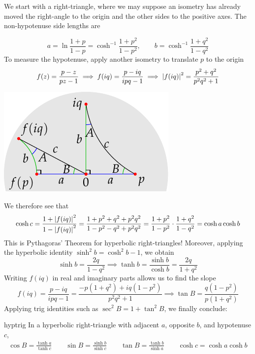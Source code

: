 We start with a right-triangle, where we may suppose an isometry has already moved the right-angle to the origin and the other sides to the positive axes. The non-hypotenuse side lengths are\par
\begin{minipage}[t]{0.675\linewidth}\vspace{-8pt}
\[a=\ln\frac{1+p}{1-p}=\cosh^{-1}\frac{1+p^2}{1-p^2},\qquad b=\cosh^{-1}\frac{1+q^2}{1-q^2}\]
To measure the hypotenuse, apply another isometry to translate $p$ to the origin
\[f(z)=\frac{p-z}{pz-1} \implies f(iq)=\frac{p-iq}{ipq-1} \implies \left| f(iq)\right|^2=\frac{p^2+q^2}{p^2q^2+1}\]
\end{minipage}\hfill\begin{minipage}[t]{0.3\linewidth}\vspace{0pt}
\flushright\includegraphics[scale=0.9]{isom-right}
\end{minipage}\medbreak
We therefore see that
\[\cosh c=\frac{1+\left| f(iq)\right|^2}{1-\left| f(iq)\right|^2}  =\frac{1+p^2+q^2+p^2q^2}{1-p^2-q^2+p^2q^2} =\frac{1+p^2}{1-p^2}\cdot\frac{1+q^2}{1-q^2} =\cosh a\cosh b\]
This is Pythagoras' Theorem for hyperbolic right-triangles!\smallbreak
Moreover, applying the hyperbolic identity $\sinh^2b=\cosh^2b-1$, we obtain
\[\sinh b=\frac{2q}{1-q^2}\implies
\tanh b=\frac{\sinh b}{\cosh b} =\frac{2q}{1+q^2}\]
Writing $f(iq)$ in real and imaginary parts allows us to find the slope
\[f(iq)=\frac{p-iq}{ipq-1} =\frac{-p(1+q^2)+iq(1-p^2)}{p^2q^2+1}\implies \tan B=\frac{q(1-p^2)}{p(1+q^2)}\]
Applying trig identities such as $\sec^2B=1+\tan^2B$, we finally conclude:

\begin{thm}{}{hyptrig}
In a hyperbolic right-triangle with adjacent $a$, opposite $b$, and hypotenuse $c$,
\begin{gather*}
\cos B=\frac{\tanh a}{\tanh c}\qquad \sin B=\frac{\sinh b}{\sinh c}\qquad \tan B=\frac{\tanh b}{\sinh a}\qquad \cosh c=\cosh a\cosh b
\end{gather*}
\end{thm}


